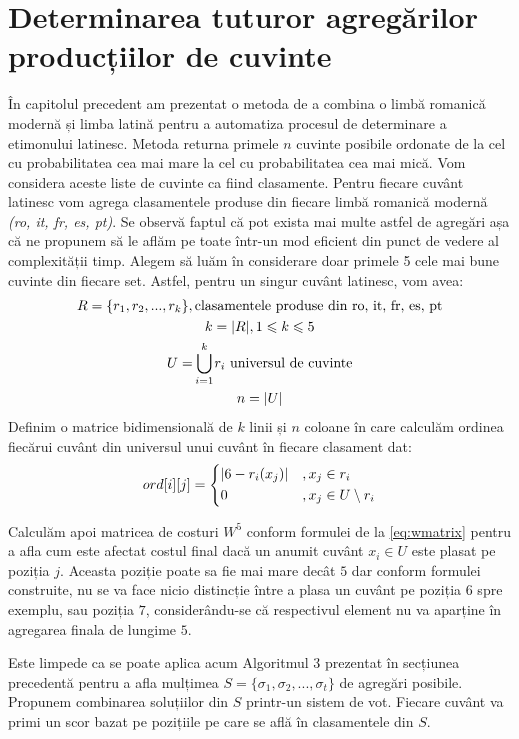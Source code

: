 \section{Determinarea tuturor agregărilor producțiilor de cuvinte}
În capitolul precedent am prezentat o metoda de a combina o limbă romanică modernă și limba latină
pentru a automatiza procesul de determinare a etimonului latinesc. Metoda returna primele $n$
cuvinte posibile ordonate de la cel cu probabilitatea cea mai mare la cel cu probabilitatea cea mai
mică. Vom considera aceste liste de cuvinte ca fiind clasamente. Pentru fiecare cuvânt latinesc vom
agrega clasamentele produse din fiecare limbă romanică modernă \textit{(ro, it, fr, es, pt)}.
Se observă faptul că pot exista mai multe astfel de agregări așa că ne propunem să le aflăm pe toate
într-un mod eficient din punct de vedere al complexității timp. Alegem să luăm în considerare
doar primele 5 cele mai bune cuvinte din fiecare set. Astfel, pentru un singur cuvânt latinesc, vom 
avea:
\begin{gather*}
  R = \{r_1, r_2, ..., r_k\}, \text{clasamentele produse din ro, it, fr, es, pt} \\
  k = |R|, 1 \leqslant k \leqslant 5 \\
  U = \smashoperator{\bigcup_{i = 1}^{k}} r_i \text{ universul de cuvinte} \\
  n = |U|
\end{gather*}
Definim o matrice bidimensională de $k$ linii și $n$ coloane în care calculăm ordinea fiecărui 
cuvânt din universul unui cuvânt în fiecare clasament dat:
\[
  ord[i][j] = \begin{dcases}
    |6 - r_i(x_j)|    &, x_j \in r_i \\
    0                 &, x_j \in U \setminus r_i 
  \end{dcases}
\]

Calculăm apoi matricea de costuri $W^5$ conform formulei de la \ref{eq:wmatrix} pentru a afla cum
este afectat costul final dacă un anumit cuvânt $x_i \in U$ este plasat pe poziția $j$. Aceasta 
poziție poate sa fie mai mare decât $5$ dar conform formulei construite, nu se va face nicio 
distincție între a plasa un cuvânt pe poziția $6$ spre exemplu, sau poziția $7$, considerându-se
că respectivul element nu va aparține în agregarea finala de lungime $5$.

Este limpede ca se poate aplica acum Algoritmul 3 prezentat în secțiunea precedentă pentru a afla
mulțimea $S = \{\sigma_1, \sigma_2, ..., \sigma_t\}$ de agregări posibile. Propunem combinarea 
soluțiilor din $S$ printr-un sistem de vot. Fiecare cuvânt va primi un scor bazat pe pozițiile pe 
care se află în clasamentele din $S$.


